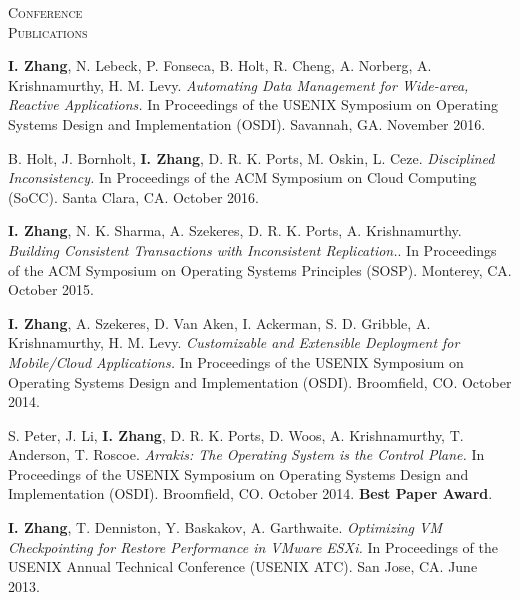 \documentclass[10pt,times]{report}
\newlength{\sectiongap}
\newlength{\sectioncolwidth}
\newlength{\colgap}
\newlength{\stuffwidth}
\newenvironment{rtable}{
  \begin{minipage}{\textwidth}
  }{
  \end{minipage}
}
\newenvironment{rsection}[1]{
  \begin{minipage}[t]{\sectioncolwidth}
    \textsc{#1}
  \end{minipage}
  \hspace{\colgap}
  \begin{minipage}[t]{\stuffwidth}
  }{
    \removelastskip
  \end{minipage}
  \\[\sectiongap]
}
\begin{document}
\begin{rtable}
 \begin{rsection}{Conference\\Publications}
   \textbf{I. Zhang}, N. Lebeck, P. Fonseca, B. Holt, R. Cheng,
   A. Norberg, A. Krishnamurthy, H.  M. Levy. \textit{Automating Data
     Management for Wide-area, Reactive Applications.}  In Proceedings
   of the USENIX Symposium on Operating Systems Design and
   Implementation (OSDI). Savannah, GA. November
   2016.\\\vspace{-0.5em}

   B. Holt, J. Bornholt, \textbf{I. Zhang}, D. R. K. Ports, M.  Oskin,
   L. Ceze. \textit{Disciplined Inconsistency.}  In Proceedings of the
   ACM Symposium on Cloud Computing (SoCC). Santa Clara, CA. October
   2016.\\\vspace{-0.5em}

   \textbf{I. Zhang}, N. K. Sharma, A. Szekeres, D. R. K. Ports,
   A. Krishnamurthy. \textit{Building Consistent Transactions with
     Inconsistent Replication.}.  In Proceedings of the ACM Symposium
   on Operating Systems Principles (SOSP). Monterey, CA. October
   2015.\\\vspace{-0.5em}

   \textbf{I. Zhang}, A. Szekeres, D. Van Aken, I. Ackerman,
   S. D. Gribble, A. Krishnamurthy, H. M. Levy. \textit{Customizable
     and Extensible Deployment for Mobile/Cloud Applications.}  In
   Proceedings of the USENIX Symposium on Operating Systems Design and
   Implementation (OSDI). Broomfield, CO. October 2014.\\
   \vspace{-0.5em}

   S. Peter, J. Li, \textbf{I. Zhang}, D. R. K. Ports, D.  Woos,
   A. Krishnamurthy, T. Anderson, T. Roscoe.  \textit{Arrakis: The
     Operating System is the Control Plane.}  In Proceedings of the
   USENIX Symposium on Operating Systems Design and Implementation
   (OSDI).  Broomfield, CO. October 2014. \textbf{Best Paper
     Award}.\\\vspace{-0.5em}

   \textbf{I. Zhang}, T. Denniston, Y. Baskakov, A. Garthwaite.
   \textit{Optimizing VM Checkpointing for Restore Performance in
     VMware ESXi.}  In Proceedings of the USENIX Annual Technical
   Conference (USENIX ATC).  San Jose, CA. June 2013.\\\vspace{-0.5em}


\end{rsection}
\end{rtable}
\end{document}
